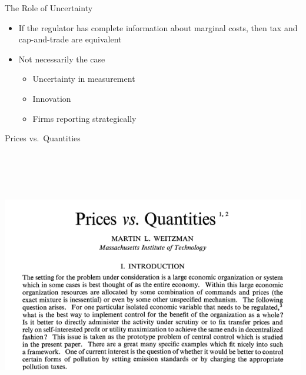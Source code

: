 \begin{frame}{The Role of Uncertainty}
\protect\hypertarget{the-role-of-uncertainty}{}

\begin{itemize}
\tightlist
\item
  If the regulator has complete information about marginal costs, then
  tax and cap-and-trade are equivalent
\item
  Not necessarily the case

  \begin{itemize}
  \tightlist
  \item
    Uncertainty in measurement
  \item
    Innovation
  \item
    Firms reporting strategically
  \end{itemize}
\end{itemize}

\end{frame}

\begin{frame}{Prices vs.~Quantities}
\protect\hypertarget{prices-vs.-quantities}{}

\includegraphics[width=\textwidth,height=4.6875in]{figures/m4_weitzman1974.png}

\end{frame}

